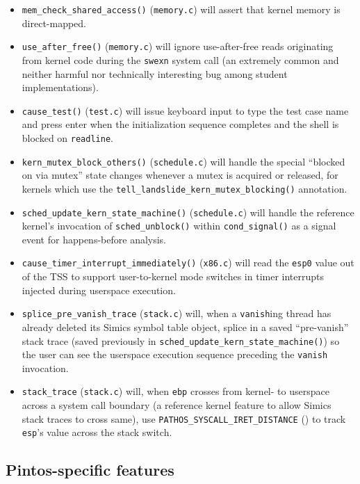 \begin{itemize}
	\item {\tt mem\_check\_shared\_access()} ({\tt memory.c})
		will assert that kernel memory is direct-mapped.
	\item {\tt use\_after\_free()} ({\tt memory.c})
		will ignore use-after-free reads originating from kernel code during the {\tt swexn} system call
		(an extremely common and neither harmful nor technically interesting bug among student implementations).
	\item {\tt cause\_test()} ({\tt test.c})
		will issue keyboard input to type the test case name and press enter
		when the initialization sequence completes and the shell is blocked on {\tt readline}.
	\item {\tt kern\_mutex\_block\_others()} ({\tt schedule.c})
		will handle the special ``blocked on via mutex'' state changes
		whenever a mutex is acquired or released,
		for kernels which use the {\tt tell\_landslide\_kern\_mutex\_blocking()} annotation.
	\item {\tt sched\_update\_kern\_state\_machine()} ({\tt schedule.c})
		will handle the reference kernel's invocation of {\tt sched\_unblock()} within {\tt cond\_\allowbreak{}signal()}
		as a signal event for happens-before analysis.
	\item {\tt cause\_timer\_interrupt\_immediately()} ({\tt x86.c})
		will read the {\tt esp0} value out of the TSS to support user-to-kernel mode switches
		in timer interrupts injected during userspace execution.
	\item {\tt splice\_pre\_vanish\_trace} ({\tt stack.c})
		will, when a {\tt vanish}ing thread has already deleted its Simics symbol table object,
		splice in a saved ``pre-vanish'' stack trace
		(saved previously in {\tt sched\_update\_kern\_state\_machine()})
		so the user can see the userspace execution sequence preceding the {\tt vanish} invocation.
	\item {\tt stack\_trace} ({\tt stack.c})
		will, when {\tt ebp} crosses from kernel- to userspace across a system call boundary
		(a reference kernel feature to allow Simics stack traces to cross same),
		use {\tt PATHOS\_SYSCALL\_IRET\_DISTANCE} (\sect{\ref{sec:landslide-config-landslide}})
		to track {\tt esp}'s value across the stack switch.
\end{itemize}


\subsection{Pintos-specific features}
\label{sec:landslide-pintosspecifics}

